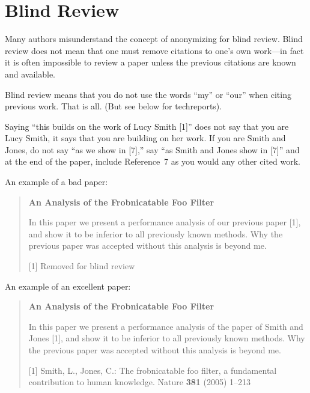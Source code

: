 \documentclass[runningheads]{llncs}
\begin{document}
\section{Blind Review}
\label{sec:blind}

Many authors misunderstand the concept of anonymizing for blind
review.  Blind review does not mean that one must remove
citations to one's own work---in fact it is often impossible to
review a paper unless the previous citations are known and
available.

Blind review means that you do not use the words ``my'' or ``our''
when citing previous work.  That is all.  (But see below for 
techreports).

Saying ``this builds on the work of Lucy Smith [1]'' does not say
that you are Lucy Smith, it says that you are building on her
work.  If you are Smith and Jones, do not say ``as we show in
[7],'' say ``as Smith and Jones show in [7]'' and at the end of the
paper, include Reference~7 as you would any other cited work.

An example of a bad paper:
\begin{quote}
\begin{center}
    {\bf An Analysis of the Frobnicatable Foo Filter}
\end{center}
   
   In this paper we present a performance analysis of our
   previous paper [1], and show it to be inferior to all
   previously known methods.  Why the previous paper was
   accepted without this analysis is beyond me.
   
   [1] Removed for blind review
\end{quote}
   
An example of an excellent paper:   
   
\begin{quote}
\begin{center}
     {\bf An Analysis of the Frobnicatable Foo Filter}
\end{center}
   
   In this paper we present a performance analysis of the
   paper of Smith and Jones [1], and show it to be inferior to
   all previously known methods.  Why the previous paper
   was accepted without this analysis is beyond me.
   
   [1] Smith, L., Jones, C.: The frobnicatable foo
   filter, a fundamental contribution to human knowledge.
   Nature {\bf 381} (2005) 1--213
\end{quote}
   
\end{document}
